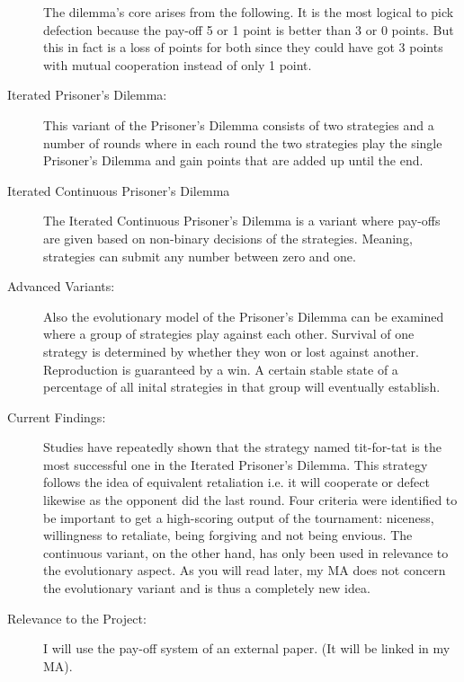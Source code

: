 \documentclass{article}
\begin{document}
\begin{description}
The dilemma's core arises from the following. It is the most logical to pick defection because the pay-off 5 or 1 point is better than 3 or 0 points. But this in fact is a loss of points for both since they could have got 3 points with mutual cooperation instead of only 1 point. 
		\item[Iterated Prisoner's Dilemma:] This variant of the Prisoner's Dilemma consists of two strategies and a number of rounds where in each round the two strategies play the single Prisoner's Dilemma and gain points that are added up until the end.
		\item[Iterated Continuous Prisoner's Dilemma] The Iterated Continuous Prisoner's Dilemma is a variant where pay-offs are given based on non-binary decisions of the strategies. Meaning, strategies can submit any number between zero and one.
		\item[Advanced Variants:]
Also the evolutionary model of the Prisoner's Dilemma can be examined where a group of strategies play against each other. Survival of one strategy is determined by whether they won or lost against another. Reproduction is guaranteed by a win. A certain stable state of a percentage of all inital strategies in that group will eventually establish.
		\item[Current Findings:] Studies have repeatedly shown that the strategy named tit-for-tat is the most successful one in the Iterated Prisoner's Dilemma. This strategy follows the idea of equivalent retaliation i.e. it will cooperate or defect likewise as the opponent did the last round. Four criteria were identified to be important to get a high-scoring output of the tournament: niceness, willingness to retaliate, being forgiving and not being envious. The continuous variant, on the other hand, has only been used in relevance to the evolutionary aspect. As you will read later, my MA does not concern the evolutionary variant and is thus a completely new idea.
		\item[Relevance to the Project:] I will use the pay-off system of an external paper. (It will be linked in my MA).  
	\end{description}
\end{document}
